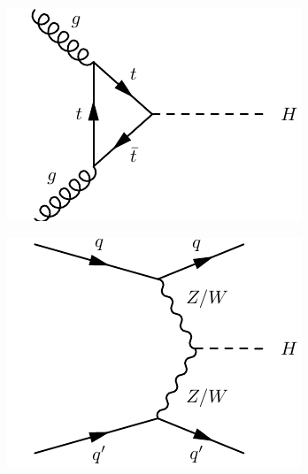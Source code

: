 \documentclass[10pt]{article}
\begin{document}
\begin{figure}[h!]

  \centering
      \begin{subfigure}[b]{0.22\textwidth}
\includegraphics[width=\textwidth]{"HiggsProduction/ggH"}
\caption{}
\end{subfigure}
    \begin{subfigure}[b]{0.22\textwidth}
\includegraphics[width=\textwidth]{"HiggsProduction/vbf"}
\caption{}
\end{subfigure}
    \begin{subfigure}[b]{0.22\textwidth}

\end{subfigure}
\end{figure}
\end{document}
